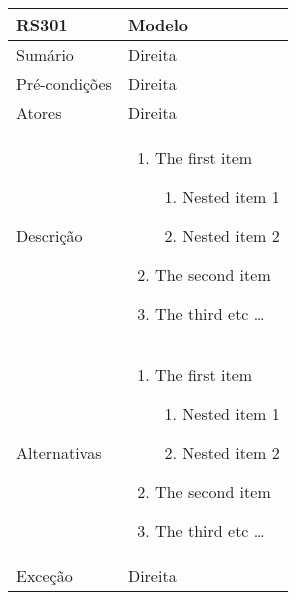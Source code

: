 \begin{quadro}[!htb]
    \begin{tabular}{|p{3cm}|p{11cm}|}
        \hline
        \textbf{RS301} & \textbf{Modelo} \\
        \hline
        Sumário        & Direita                  \\
        \hline
        Pré-condições  & Direita                  \\
        \hline
        Atores         & Direita                  \\
        \hline
        Descrição      &
        \begin{enumerate}
            \item The first item
                  \begin{enumerate}
                      \item Nested item 1
                      \item Nested item 2
                  \end{enumerate}
            \item The second item
            \item The third etc \ldots
        \end{enumerate}                 \\
        \hline
        Alternativas   &
        \begin{enumerate}
            \item The first item
                  \begin{enumerate}
                      \item Nested item 1
                      \item Nested item 2
                  \end{enumerate}
            \item The second item
            \item The third etc \ldots
        \end{enumerate}                 \\
        \hline
        Exceção        & Direita                  \\
        \hline
    \end{tabular}
\end{quadro}